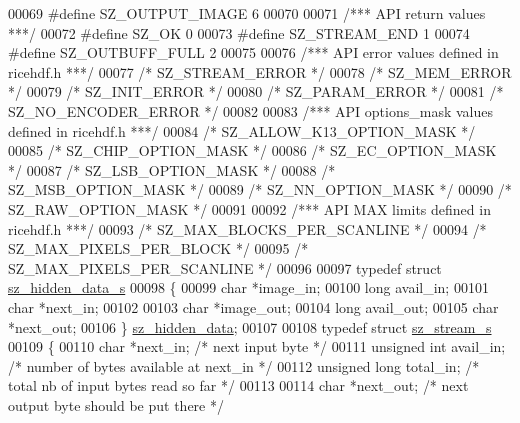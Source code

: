 \begin{DoxyCode}
00069 \textcolor{preprocessor}{#define SZ\_OUTPUT\_IMAGE  6}
00070 
00071 \textcolor{comment}{/*** API return values ***/}
00072 \textcolor{preprocessor}{#define SZ\_OK            0}
00073 \textcolor{preprocessor}{#define SZ\_STREAM\_END    1}
00074 \textcolor{preprocessor}{#define SZ\_OUTBUFF\_FULL 2}
00075 
00076 \textcolor{comment}{/*** API error values defined in ricehdf.h ***/}
00077 \textcolor{comment}{/* SZ\_STREAM\_ERROR */}
00078 \textcolor{comment}{/* SZ\_MEM\_ERROR    */}
00079 \textcolor{comment}{/* SZ\_INIT\_ERROR   */}
00080 \textcolor{comment}{/* SZ\_PARAM\_ERROR  */}
00081 \textcolor{comment}{/* SZ\_NO\_ENCODER\_ERROR  */}
00082 
00083 \textcolor{comment}{/*** API options\_mask values defined in ricehdf.h ***/}
00084 \textcolor{comment}{/* SZ\_ALLOW\_K13\_OPTION\_MASK */}
00085 \textcolor{comment}{/* SZ\_CHIP\_OPTION\_MASK      */}
00086 \textcolor{comment}{/* SZ\_EC\_OPTION\_MASK        */}
00087 \textcolor{comment}{/* SZ\_LSB\_OPTION\_MASK       */}
00088 \textcolor{comment}{/* SZ\_MSB\_OPTION\_MASK       */}
00089 \textcolor{comment}{/* SZ\_NN\_OPTION\_MASK        */}
00090 \textcolor{comment}{/* SZ\_RAW\_OPTION\_MASK       */}
00091 
00092 \textcolor{comment}{/*** API MAX limits defined in ricehdf.h ***/}
00093 \textcolor{comment}{/* SZ\_MAX\_BLOCKS\_PER\_SCANLINE */}
00094 \textcolor{comment}{/* SZ\_MAX\_PIXELS\_PER\_BLOCK    */}
00095 \textcolor{comment}{/* SZ\_MAX\_PIXELS\_PER\_SCANLINE */}
00096 
00097 \textcolor{keyword}{typedef} \textcolor{keyword}{struct }\hyperlink{structsz__hidden__data__s}{sz\_hidden\_data\_s}
00098     \{
00099     \textcolor{keywordtype}{char} *image\_in;
00100     \textcolor{keywordtype}{long} avail\_in;
00101     \textcolor{keywordtype}{char} *next\_in;
00102 
00103     \textcolor{keywordtype}{char} *image\_out;
00104     \textcolor{keywordtype}{long} avail\_out;
00105     \textcolor{keywordtype}{char} *next\_out;
00106     \} \hyperlink{structsz__hidden__data__s}{sz\_hidden\_data};
00107 
00108 \textcolor{keyword}{typedef} \textcolor{keyword}{struct }\hyperlink{structsz__stream__s}{sz\_stream\_s}
00109     \{
00110     \textcolor{keywordtype}{char}            *next\_in;  \textcolor{comment}{/* next input byte */}
00111     \textcolor{keywordtype}{unsigned} \textcolor{keywordtype}{int}    avail\_in;  \textcolor{comment}{/* number of bytes available at next\_in */}
00112     \textcolor{keywordtype}{unsigned} \textcolor{keywordtype}{long}    total\_in;  \textcolor{comment}{/* total nb of input bytes read so far */}
00113 
00114     \textcolor{keywordtype}{char}            *next\_out; \textcolor{comment}{/* next output byte should be put there */}

\end{DoxyCode}
